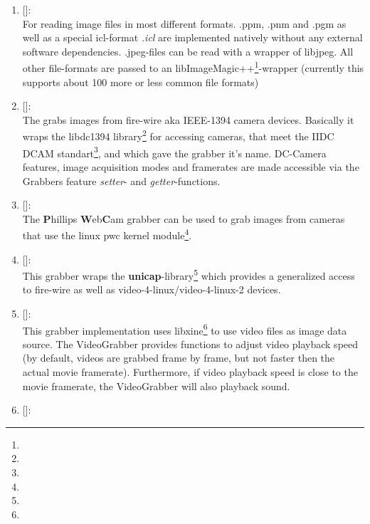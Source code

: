 \begin{enumerate}
\item {} []:\\
 For reading image files in most different formats. .ppm, .pnm and .pgm as well as a special icl-format \emph{.icl} are implemented natively without any external software dependencies. .jpeg-files can be read with a wrapper of libjpeg. All other file-formats are passed to an libImageMagic++\footnote{}-wrapper (currently this supports about 100 more or less common file formats)
%
\item {} []:\\
The  grabs images from fire-wire aka IEEE-1394 camera devices. Basically it wraps the libdc1394 library\footnote{} for accessing cameras, that meet the IIDC DCAM standart\footnote{}, and which gave the grabber it's name. DC-Camera features, image acquisition modes and framerates are made accessible via the Grabbers feature \emph{setter}- and \emph{getter}-functions.
%
\item {} []:\\
The \textbf{P}hillips \textbf{W}eb\textbf{C}am grabber can be used to grab images from cameras that use the linux pwc kernel module\footnote{}.
\item {} []:\\
This grabber wraps the \textbf{unicap}-library\footnote{} which provides a generalized access to fire-wire as well as video-4-linux/video-4-linux-2 devices.  
\item {} []:\\
This grabber implementation uses libxine\footnote{} to use video files as image data source. The VideoGrabber provides functions to adjust video playback speed (by default, videos are grabbed frame by frame, but not faster then the actual movie framerate). Furthermore, if video playback speed is close to the movie framerate, the VideoGrabber will also playback sound. 
\item {} []:\\

\end{enumerate}

